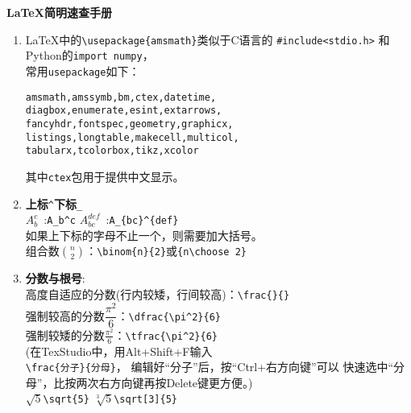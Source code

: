 \documentclass[fontset=windows]{article}
\newcommand{\q}{\quad}
\begin{document}
\begin{center}
{\Large \textbf{\LaTeX 简明速查手册} }
\end{center}  


\begin{multicols}{2}     
\begin{enumerate}

\item \LaTeX 中的\verb|\usepackage{amsmath}|类似于C语言的 \verb|#include<stdio.h>|
和Python的\verb|import numpy|，\\
常用\verb|usepackage|如下：
\begin{lstlisting}
amsmath,amssymb,bm,ctex,datetime, 
diagbox,enumerate,esint,extarrows,
fancyhdr,fontspec,geometry,graphicx,
listings,longtable,makecell,multicol,
tabularx,tcolorbox,tikz,xcolor  
\end{lstlisting} 
其中\verb|ctex|包用于提供中文显示。

\item \textbf{上标}\q \verb|^|\q \textbf{下标}\q \verb|_| \\
$ A_b^c $\ :\q \verb|A_b^c| \q\q\q\q 
$ A_{bc}^{def} $\ :\q \verb|A_{bc}^{def}| \\
如果上下标的字母不止一个，则需要加大括号。\\
组合数$ \binom{n}{2} $：\verb|\binom{n}{2}|或\verb|{n\choose 2}|

\item \textbf{分数与根号}:\\
高度自适应的分数(行内较矮，行间较高)：\verb|\frac{}{}|\\
强制较高的分数$ \dfrac{\pi^2}{6} $：\verb|\dfrac{\pi^2}{6}| \\
强制较矮的分数$ \tfrac{\pi^2}{6} $：\verb|\tfrac{\pi^2}{6}| \\
(在TexStudio中，用Alt+Shift+F输入\\\verb|\frac{分子}{分母}|，
编辑好“分子”后，按“Ctrl+右方向键”可以
快速选中“分母”，比按两次右方向键再按Delete键更方便。)\\
$ \sqrt{5} $\q \verb|\sqrt{5}| \q\q\q\q 
$ \sqrt[3]{5} $\q \verb|\sqrt[3]{5}| 



\end{enumerate}
\end{multicols}
\end{document}
